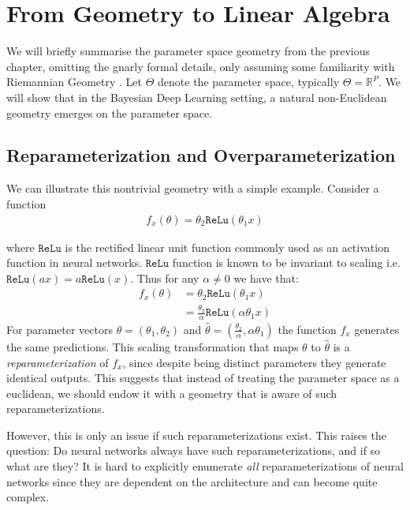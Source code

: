 \section{From Geometry to Linear Algebra}
\label{sec:bridge_dg_la}

We will briefly summarise the parameter space geometry from the previous chapter, omitting the gnarly formal details, only assuming some familiarity with Riemannian Geometry \citep{Soren notes}. Let $\Theta$ denote the parameter space, typically $\Theta=\mathbb{R}^P$. We will show that in the Bayesian Deep Learning setting, a natural non-Euclidean geometry emerges on the parameter space. 

\subsection{Reparameterization and Overparameterization}
We can illustrate this nontrivial geometry with a simple example. Consider a function 
\begin{align}
    f_x(\theta) = \theta_2 \texttt{ReLu}(\theta_1 x)
\end{align}

where $ \texttt{ReLu}$ is the rectified linear unit function commonly used as an activation function in neural networks. $\texttt{ReLu}$ function is known to be invariant to scaling i.e. $\texttt{ReLu}(ax) = a \texttt{ReLu}(x)$. Thus for any $\alpha \neq 0$ we have that:
\begin{align}
     f_x(\theta) &= \theta_2 \texttt{ReLu}(\theta_1 x) \\
     &= \frac{\theta_2}{\alpha}\texttt{ReLu}(\alpha \theta_1 x)
\end{align}
For parameter vectors $\theta = (\theta_1, \theta_2)$ and $\hat{\theta} = (\frac{\theta_2}{\alpha}, \alpha \theta_1)$ the function $f_x$ generates the same predictions. This scaling transformation that maps $\theta$ to $\hat{\theta}$ is a \emph{reparameterization} of $f_x$, since despite being distinct parameters they generate identical outputs. This suggests that instead of treating the parameter space as a euclidean, we should endow it with a geometry that is aware of such reparameterizations. 

However, this is only an issue if such reparameterizations exist. This raises the question: Do neural networks always have such reparameterizations, and if so what are they? It is hard to explicitly enumerate \emph{all} reparameterizations of neural networks since they are dependent on the architecture and can become quite complex. 

